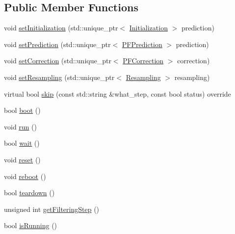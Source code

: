 \subsection*{Public Member Functions}
\begin{DoxyCompactItemize}
\item 
void \mbox{\hyperlink{classbfl_1_1ParticleFilter_abfeb75fd575802f362039c26169eed8b}{set\+Initialization}} (std\+::unique\+\_\+ptr$<$ \mbox{\hyperlink{classbfl_1_1Initialization}{Initialization}} $>$ prediction)
\item 
void \mbox{\hyperlink{classbfl_1_1ParticleFilter_a213811368143c1f498c87be70cf02379}{set\+Prediction}} (std\+::unique\+\_\+ptr$<$ \mbox{\hyperlink{classbfl_1_1PFPrediction}{P\+F\+Prediction}} $>$ prediction)
\item 
void \mbox{\hyperlink{classbfl_1_1ParticleFilter_a3d2935addf4481325a3fe8b99fe4d07a}{set\+Correction}} (std\+::unique\+\_\+ptr$<$ \mbox{\hyperlink{classbfl_1_1PFCorrection}{P\+F\+Correction}} $>$ correction)
\item 
void \mbox{\hyperlink{classbfl_1_1ParticleFilter_ad1618ed06b6e6e143e309e2267b970ee}{set\+Resampling}} (std\+::unique\+\_\+ptr$<$ \mbox{\hyperlink{classbfl_1_1Resampling}{Resampling}} $>$ resampling)
\item 
virtual bool \mbox{\hyperlink{classbfl_1_1ParticleFilter_a2d7a5e7aaad179037273d35be229056d}{skip}} (const std\+::string \&what\+\_\+step, const bool status) override
\item 
bool \mbox{\hyperlink{classbfl_1_1FilteringAlgorithm_a96651f8464190c0a56d79219a1017147}{boot}} ()
\item 
void \mbox{\hyperlink{classbfl_1_1FilteringAlgorithm_a009cbe5f4bbb16967f6c6ddcaed8fbb1}{run}} ()
\item 
bool \mbox{\hyperlink{classbfl_1_1FilteringAlgorithm_a40372c24fa050eb0274371172df0a244}{wait}} ()
\item 
void \mbox{\hyperlink{classbfl_1_1FilteringAlgorithm_a2403c62fbd7bd7f5cda56a84f5f30331}{reset}} ()
\item 
void \mbox{\hyperlink{classbfl_1_1FilteringAlgorithm_a6022859aa985474fb997343cc935b11e}{reboot}} ()
\item 
bool \mbox{\hyperlink{classbfl_1_1FilteringAlgorithm_a1dc912d89ee8f96d4f3e8209865c5308}{teardown}} ()
\item 
unsigned int \mbox{\hyperlink{classbfl_1_1FilteringAlgorithm_a8c43b1f3dac30934c0a03de348d4a29d}{get\+Filtering\+Step}} ()
\item 
bool \mbox{\hyperlink{classbfl_1_1FilteringAlgorithm_a5cfecab2c778620e2557237472bb1721}{is\+Running}} ()
\end{DoxyCompactItemize}
